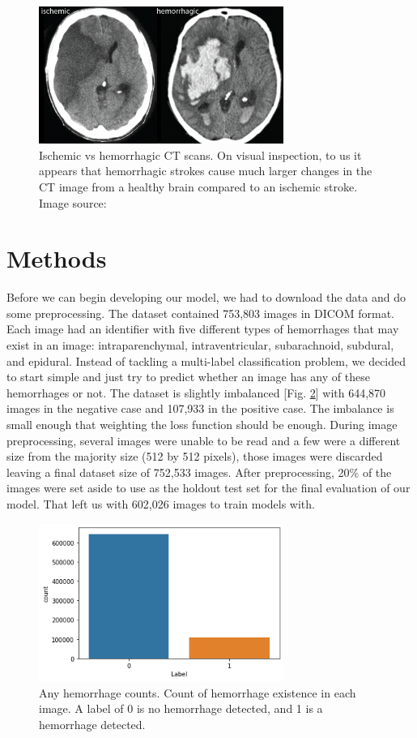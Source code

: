 \documentclass{article}
\begin{document}
\begin{figure}[]
    \centering
    \includegraphics[width=8cm]{ischemic_vs_hemorrhagic}
    \caption{Ischemic vs hemorrhagic CT scans. On visual inspection, to us it appears that hemorrhagic strokes cause much larger changes in the CT image from a healthy brain compared to an ischemic stroke. Image source: \cite{Stroke_Comparison}}
    \label{fig:ischemic_vs_hemorrhagic}
\end{figure}

\section{Methods}
    Before we can begin developing our model, we had to download the data and do some preprocessing. The dataset contained 753,803 images in DICOM format. Each image had an identifier with five different types of hemorrhages that may exist in an image: intraparenchymal, intraventricular, subarachnoid, subdural, and epidural. Instead of tackling a multi-label classification problem, we decided to start simple and just try to predict whether an image has any of these hemorrhages or not. The dataset is slightly imbalanced [Fig. \ref{fig:any_hemo_count}] with 644,870 images in the negative case and 107,933 in the positive case. The imbalance is small enough that weighting the loss function should be enough. During image preprocessing, several images were unable to be read and a few were a different size from the majority size (512 by 512 pixels), those images were discarded leaving a final dataset size of 752,533 images. After preprocessing, 20\% of the images were set aside to use as the holdout test set for the final evaluation of our model. That left us with 602,026 images to train models with.
    
\begin{figure}[]
    \centering
    \includegraphics[width=8cm]{any_hemo_count}
    \caption{Any hemorrhage counts. Count of hemorrhage existence in each image. A label of 0 is no hemorrhage detected, and 1 is a hemorrhage detected.}
    \label{fig:any_hemo_count}
\end{figure}
\end{document}

